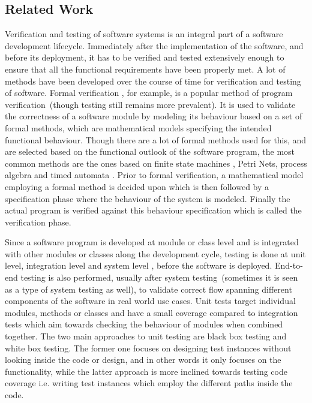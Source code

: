 \raggedbottom
\subsection{Related Work}

Verification and testing of software systems \cite{myers2011art} is an integral part of a software development lifecycle. Immediately after the implementation of the software, and before its deployment, it has to be verified and tested extensively enough to ensure that all the functional requirements have been properly met. A lot of methods have been developed over the course of time for verification and testing of software. Formal verification \cite{wang2004formal}, for example, is a popular method of program verification~(though testing still remains more prevalent). It is used to validate the correctness of a software module by modeling its behaviour based on a set of formal methods, which are mathematical models specifying the intended functional behaviour. Though there are a lot of formal methods used for this, and are selected based on the functional outlook of the software program, the most common methods are the ones based on finite state machines \cite{chow1978testing}, Petri Nets, process algebra and timed automata \cite{clarke1996formal}. Prior to formal verification, a mathematical model employing a formal method is decided upon which is then followed by a specification phase where the behaviour of the system is modeled. Finally the actual program is verified against this behaviour specification which is called the verification phase.%

Since a software program is developed at module or class level and is integrated with other modules or classes along the development cycle, testing is done at unit level, integration level and system level \cite{myers2011art}, before the software is deployed. End-to-end testing \cite{tsai2001end} is also performed, usually after system testing~(sometimes it is seen as a type of system testing as well), to validate correct flow spanning different components of the software in real world use cases. Unit tests target individual modules, methods or classes and have a small coverage compared to integration tests which aim towards checking the behaviour of modules when combined together. The two main approaches to unit testing are black box testing and white box testing. The former one focuses on designing test instances without looking inside the code or design, and in other words %
it only focuses on the functionality, while the latter approach is more inclined towards testing code coverage i.e. writing test instances which employ the different paths inside the code.

